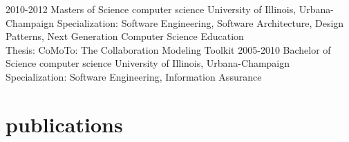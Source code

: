 \documentclass{friggeri-cv} %
\begin{document}
\begin{entrylist}
\entry
{2010-2012}
{Masters of Science {\normalfont computer science}}
{University of Illinois, Urbana-Champaign}
{Specialization: Software Engineering, Software Architecture, Design Patterns, Next Generation Computer Science Education \\ 
Thesis: CoMoTo: The Collaboration Modeling Toolkit }
\entry
{2005-2010}
{Bachelor of Science {\normalfont computer science}}
{University of Illinois, Urbana-Champaign}
{Specialization: Software Engineering, Information Assurance}
\end{entrylist}


\section{publications}





\end{document}
